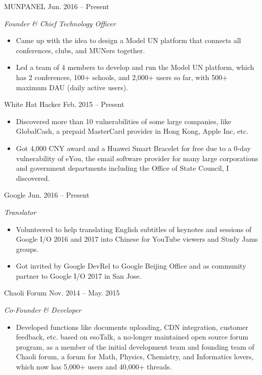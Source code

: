 \documentclass[]{adamyi-cv} %
\begin{document}
\begin{entrylist}


\entry
{MUNPANEL}
{Jun. 2016 -- Present}
{\emph{Founder \& Chief Technology Officer}
\begin{itemize}
\item Came up with the idea to design a Model UN platform that connects all conferences, clubs, and MUNers together.
\item Led a team of 4 members to develop and run the Model UN platform, which has 2 conferences, 100+ schools, and 2,000+ users so far, with 500+ maximum DAU (daily active users).
\end{itemize}}


\entry
{White Hat Hacker}
{Feb. 2015 -- Present}
{\begin{itemize}
\item Discovered more than 10 vulnerabilities of some large companies, like GlobalCash, a prepaid MasterCard provider in Hong Kong, Apple Inc, etc.
\item Got 4,000 CNY award and a Huawei Smart Bracelet for free due to a 0-day vulnerability of eYou, the email software provider for many large corporations and government departments including the Office of State Council, I discovered.
\end{itemize}}


\entry
{Google}
{Jun. 2016 -- Present}
{\emph{Translator}
\begin{itemize}
\item Volunteered to help translating English subtitles of keynotes and sessions of Google I/O 2016 and 2017 into Chinese for YouTube viewers and Study Jams groups.
\item Got invited by Google DevRel to Google Beijing Office and as community partner to Google I/O 2017 in San Jose.
\end{itemize}}


\entry
{Chaoli Forum}
{Nov. 2014 -- May. 2015}
{\emph{Co-Founder \& Developer}
\begin{itemize}
\item Developed functions like documents uploading, CDN integration, customer feedback, etc. based on esoTalk, a no-longer maintained open source forum program, as a member of the initial development team and founding team of Chaoli forum, a forum for Math, Physics, Chemistry, and Informatics lovers, which now has 5,000+ users and 40,000+ threads.
\end{itemize}}


\end{entrylist}
\end{document}
